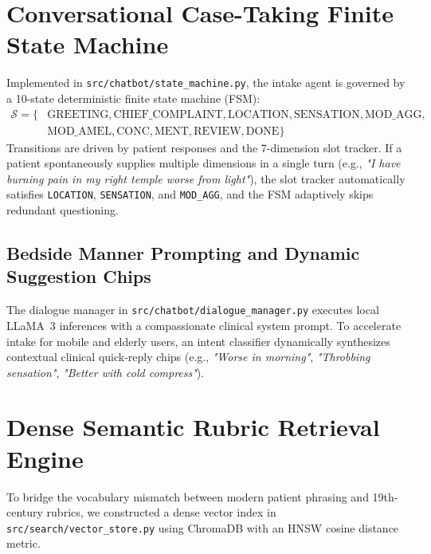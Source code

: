 \begin{sloppypar}
\section{Conversational Case-Taking Finite State Machine}
Implemented in \texttt{src/chatbot/state\_machine.py}, the intake agent is governed by a 10-state deterministic finite state machine (FSM):
\begin{equation}
\begin{aligned}
    \mathcal{S} = \{&\text{GREETING}, \text{CHIEF\_COMPLAINT}, \text{LOCATION}, \text{SENSATION}, \text{MOD\_AGG},\\
    &\text{MOD\_AMEL}, \text{CONC}, \text{MENT}, \text{REVIEW}, \text{DONE}\}
\end{aligned}
\end{equation}
Transitions are driven by patient responses and the 7-dimension slot tracker. If a patient spontaneously supplies multiple dimensions in a single turn (e.g., \emph{"I have burning pain in my right temple worse from light"}), the slot tracker automatically satisfies \texttt{LOCATION}, \texttt{SENSATION}, and \texttt{MOD\_AGG}, and the FSM adaptively skips redundant questioning.

\subsection{Bedside Manner Prompting and Dynamic Suggestion Chips}
The dialogue manager in \texttt{src/chatbot/dialogue\_manager.py} executes local LLaMA~3 inferences with a compassionate clinical system prompt. To accelerate intake for mobile and elderly users, an intent classifier dynamically synthesizes contextual clinical quick-reply chips (e.g., \emph{"Worse in morning"}, \emph{"Throbbing sensation"}, \emph{"Better with cold compress"}).

\section{Dense Semantic Rubric Retrieval Engine}
To bridge the vocabulary mismatch between modern patient phrasing and 19th-century rubrics, we constructed a dense vector index in \texttt{src/search/vector\_store.py} using ChromaDB with an HNSW cosine distance metric.


\end{sloppypar}
